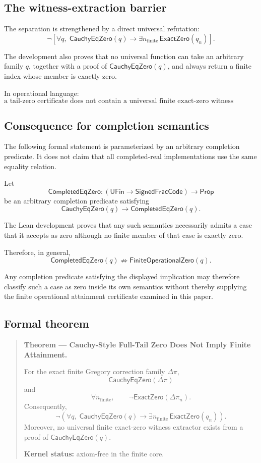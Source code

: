 \documentclass[11pt,a4paper]{article}
\begin{document}
\subsection{The witness-extraction barrier}

The separation is strengthened by a direct universal refutation:
\[
\boxed{
\neg\left[
\forall q,\;
\mathsf{CauchyEqZero}(q)
\rightarrow
\exists n_{\mathrm{finite}}\,
\mathsf{ExactZero}(q_n)
\right].
}
\]

The development also proves that no universal function can take an
arbitrary family \(q\), together with a proof of
\(\mathsf{CauchyEqZero}(q)\), and always return a finite index whose
member is exactly zero.

In operational language:
\[
\boxed{
\text{a tail-zero certificate does not contain a universal
finite exact-zero witness extractor.}
}
\]

\subsection{Consequence for completion semantics}

The following formal statement is parameterized by an arbitrary
completion predicate. It does not claim that all completed-real
implementations use the same equality relation.

Let
\[
\mathsf{CompletedEqZero}
:
(\mathsf{UFin}\to\mathsf{SignedFracCode})
\to
\mathsf{Prop}
\]
be an arbitrary completion predicate satisfying
\[
\mathsf{CauchyEqZero}(q)
\rightarrow
\mathsf{CompletedEqZero}(q).
\]

The Lean development proves that any such semantics necessarily admits
a case that it accepts as zero although no finite member of that case
is exactly zero.

Therefore, in general,
\[
\boxed{
\mathsf{CompletedEqZero}(q)
\not\Rightarrow
\mathsf{FiniteOperationalZero}(q).
}
\]

Any completion predicate satisfying the displayed implication may
therefore classify such a case as zero inside its own semantics
without thereby supplying the finite operational attainment
certificate examined in this paper.

\subsection{Formal theorem}

\begin{quote}
\textbf{Theorem --- Cauchy-Style Full-Tail Zero Does Not Imply
Finite Attainment.}

For the exact finite Gregory correction family \(\Delta\pi\),
\[
\mathsf{CauchyEqZero}(\Delta\pi)
\]
and
\[
\forall n_{\mathrm{finite}},
\qquad
\neg\mathsf{ExactZero}(\Delta\pi_n).
\]
Consequently,
\[
\neg\left(
\forall q,\;
\mathsf{CauchyEqZero}(q)
\rightarrow
\exists n_{\mathrm{finite}}\,
\mathsf{ExactZero}(q_n)
\right).
\]
Moreover, no universal finite exact-zero witness extractor exists from
a proof of \(\mathsf{CauchyEqZero}(q)\).

\textbf{Kernel status:} axiom-free in the finite core.
\end{quote}
\end{document}
